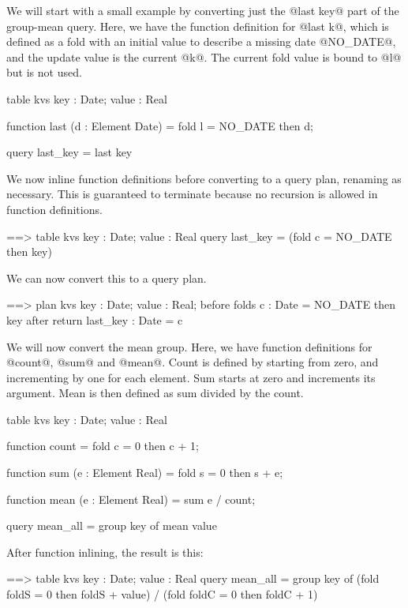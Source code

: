 We will start with a small example by converting just the @last key@ part of the group-mean query.
Here, we have the function definition for @last k@, which is defined as a fold with an initial value to describe a missing date @NO_DATE@, and the update value is the current @k@.
The current fold value is bound to @l@ but is not used.

\begin{code}
    table kvs { key : Date; value : Real } 

    function last (d : Element Date)
     = fold l = NO_DATE then d;

    query last_key = last key
\end{code}

We now inline function definitions before converting to a query plan, renaming as necessary.
This is guaranteed to terminate because no recursion is allowed in function definitions.

\begin{code}
==> table kvs { key : Date; value : Real } 
    query last_key = (fold c = NO_DATE then key)
\end{code}

We can now convert this to a query plan.

\begin{code}
==> plan kvs { key : Date; value : Real; }
    before { }
    folds  { c : Date = NO_DATE then key }
    after  { }
    return { last_key : Date = c }
\end{code}

We will now convert the mean group.
Here, we have function definitions for @count@, @sum@ and @mean@.
Count is defined by starting from zero, and incrementing by one for each element.
Sum starts at zero and increments its argument.
Mean is then defined as sum divided by the count.

\begin{code}
    table kvs { key : Date; value : Real } 

    function count
     = fold c = 0 then c + 1;

    function sum (e : Element Real)
     = fold s = 0 then s + e;

    function mean (e : Element Real)
     = sum e / count;

    query mean_all = group key of mean value
\end{code}

After function inlining, the result is this:
\begin{code}
==> table kvs { key : Date; value : Real } 
    query mean_all = group key
     of (fold foldS = 0 then foldS + value)
      / (fold foldC = 0 then foldC + 1)
\end{code}

